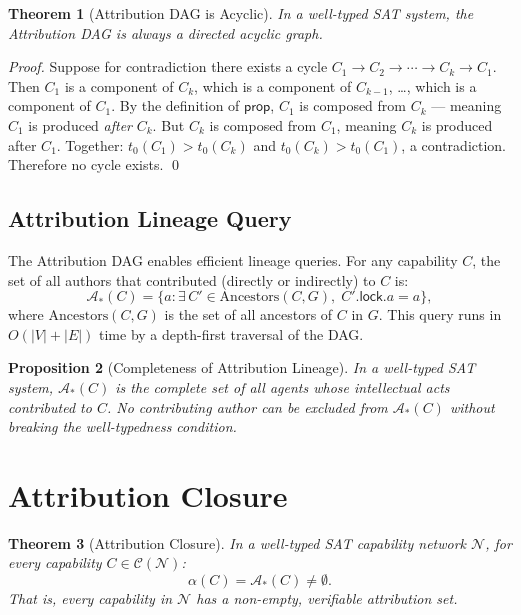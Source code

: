 \documentclass[12pt]{article}
\newtheorem{theorem}{Theorem}
\newtheorem{proposition}[theorem]{Proposition}
\newcommand{\ATTR}{\mathcal{A}}
\newcommand{\LOCK}{\mathsf{lock}}
\newcommand{\PROP}{\mathsf{prop}}
\begin{document}
\begin{theorem}[Attribution DAG is Acyclic]
  In a well-typed SAT system, the Attribution DAG is always a directed acyclic
  graph.
\end{theorem}

\begin{proof}
  Suppose for contradiction there exists a cycle
  $C_1 \to C_2 \to \cdots \to C_k \to C_1$.
  Then $C_1$ is a component of $C_k$, which is a component of $C_{k-1}$, \ldots,
  which is a component of $C_1$.  By the definition of $\PROP$, $C_1$ is
  composed from $C_k$ — meaning $C_1$ is produced \emph{after} $C_k$.
  But $C_k$ is composed from $C_1$, meaning $C_k$ is produced after $C_1$.
  Together: $t_0(C_1) > t_0(C_k)$ and $t_0(C_k) > t_0(C_1)$, a contradiction.
  Therefore no cycle exists. \qed
\end{proof}

\subsection{Attribution Lineage Query}

The Attribution DAG enables efficient lineage queries.  For any capability $C$,
the set of all authors that contributed (directly or indirectly) to $C$ is:
\[
  \ATTR_*(C) = \{a : \exists\, C' \in \text{Ancestors}(C, G),\;
  C'.\LOCK.a = a\},
\]
where $\text{Ancestors}(C, G)$ is the set of all ancestors of $C$ in $G$.  This
query runs in $O(|V| + |E|)$ time by a depth-first traversal of the DAG.

\begin{proposition}[Completeness of Attribution Lineage]
  In a well-typed SAT system, $\ATTR_*(C)$ is the complete set of all agents
  whose intellectual acts contributed to $C$.  No contributing author can be
  excluded from $\ATTR_*(C)$ without breaking the well-typedness condition.
\end{proposition}

\section{Attribution Closure}
\label{sec:closure}

\begin{theorem}[Attribution Closure]
  In a well-typed SAT capability network $\mathcal{N}$, for every capability
  $C \in \mathcal{C}(\mathcal{N})$:
  \[
    \alpha(C) = \ATTR_*(C) \ne \emptyset.
  \]
  That is, every capability in $\mathcal{N}$ has a non-empty, verifiable
  attribution set.
\end{theorem}
\end{document}

